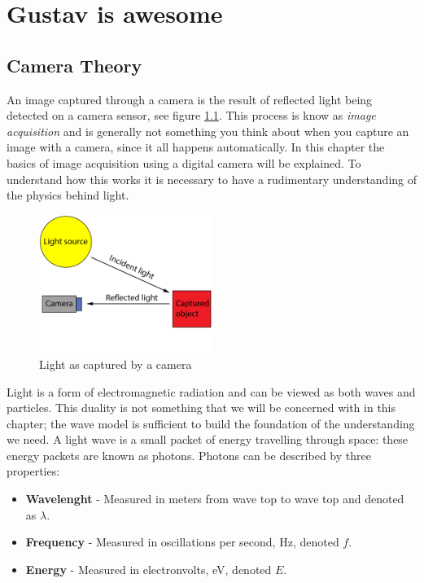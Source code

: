 \chapter{Gustav is awesome}

\section{Camera Theory}

An image captured through a camera is the result of reflected light being detected on a camera sensor, see figure \ref{fig:light_cam}. This process is know as \textit{image acquisition} and is generally not something you think about when you capture an image with a camera, since it all happens automatically. In this chapter the basics of image acquisition using a digital camera will be explained. To understand how this works it is necessary to have a rudimentary understanding of the physics behind light.

\begin{figure}[htbp] 
\centering 
\includegraphics[width=0.5\textwidth]{Pictures/Theory/light_from_sun.png} 
\caption{Light as captured by a camera} 
\label{fig:light_cam} 
\end{figure}

Light is a form of electromagnetic radiation and can be viewed as both waves and particles. This duality is not something that we will be concerned with in this chapter; the wave model is sufficient to build the foundation of the understanding we need. A light wave is a small packet of energy travelling through space: these energy packets are known as photons. Photons can be described by three properties:

\begin{itemize}
\item \textbf{Wavelenght} - Measured in meters from wave top to wave top and denoted as $\lambda$.
\item \textbf{Frequency} - Measured in oscillations per second, Hz, denoted $f$.
\item \textbf{Energy} - Measured in electronvolts, eV, denoted $E$.
\end{itemize}

